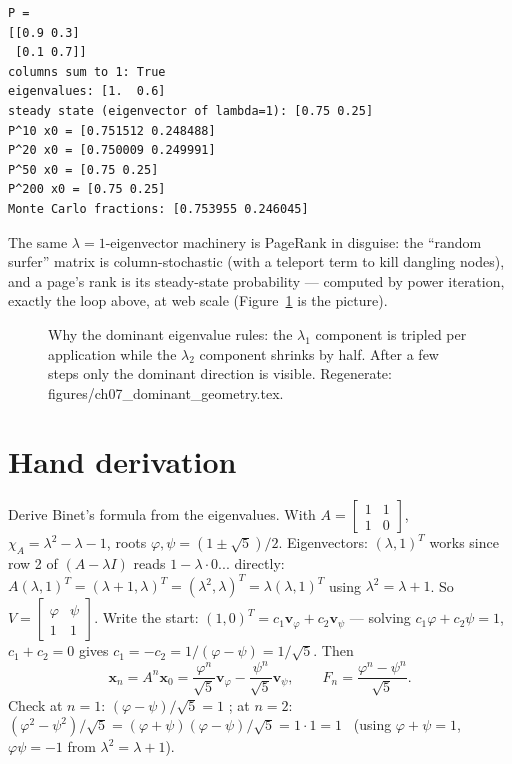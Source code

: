 \begin{lstlisting}[caption={Output of the Markov check. Notice three
routes to the same answer --- eigenvector $(0.75,0.25)$, powers converging
by $k=20$, Monte-Carlo fractions within sampling error. The subdominant
eigenvalue $0.6$ sets the convergence speed.}]
P =
[[0.9 0.3]
 [0.1 0.7]]
columns sum to 1: True
eigenvalues: [1.  0.6]
steady state (eigenvector of lambda=1): [0.75 0.25]
P^10 x0 = [0.751512 0.248488]
P^20 x0 = [0.750009 0.249991]
P^50 x0 = [0.75 0.25]
P^200 x0 = [0.75 0.25]
Monte Carlo fractions: [0.753955 0.246045]
\end{lstlisting}

The same $\lambda=1$-eigenvector machinery is PageRank in disguise: the
``random surfer'' matrix is column-stochastic (with a teleport term to
kill dangling nodes), and a page's rank is its steady-state probability ---
computed by power iteration, exactly the loop above, at web scale
(Figure~\ref{fig:dominant-geo} is the picture).

\begin{figure}[htbp]
\centering

\caption{Why the dominant eigenvalue rules: the $\lambda_1$ component is
tripled per application while the $\lambda_2$ component shrinks by half.
After a few steps only the dominant direction is visible.
Regenerate: \ttfamily figures/ch07\_dominant\_geometry.tex.}
\label{fig:dominant-geo}
\end{figure}

\section{Hand derivation}\label{sec:handderiv7}

Derive Binet's formula from the eigenvalues. With
$A=\begin{bmatrix}1&1\\1&0\end{bmatrix}$,
$\chi_A=\lambda^2-\lambda-1$, roots
$\varphi,\psi=(1\pm\sqrt5)/2$. Eigenvectors: $(\lambda,1)^{T}$ works since
row 2 of $(A-\lambda I)$ reads $1-\lambda\cdot0$... directly:
$A(\lambda,1)^{T}=(\lambda+1,\lambda)^{T}=(\lambda^2,\lambda)^{T}
=\lambda(\lambda,1)^{T}$ using $\lambda^2=\lambda+1$. So
$V=\begin{bmatrix}\varphi&\psi\\1&1\end{bmatrix}$. Write the start:
$(1,0)^{T}=c_1\mathbf v_\varphi+c_2\mathbf v_\psi$ --- solving
$c_1\varphi+c_2\psi=1$, $c_1+c_2=0$ gives $c_1=-c_2=1/(\varphi-\psi)=1/\sqrt5$.
Then
\[
\mathbf x_n=A^{n}\mathbf x_0=\frac{\varphi^{n}}{\sqrt5}\mathbf v_\varphi
-\frac{\psi^{n}}{\sqrt5}\mathbf v_\psi,
\qquad
F_n=\frac{\varphi^{n}-\psi^{n}}{\sqrt5}.
\]
Check at $n=1$: $(\varphi-\psi)/\sqrt5=1$ \checkmark; at $n=2$:
$(\varphi^2-\psi^2)/\sqrt5=(\varphi+\psi)(\varphi-\psi)/\sqrt5=1\cdot1=1$
\checkmark\ (using $\varphi+\psi=1$, $\varphi\psi=-1$ from
$\lambda^2=\lambda+1$).

